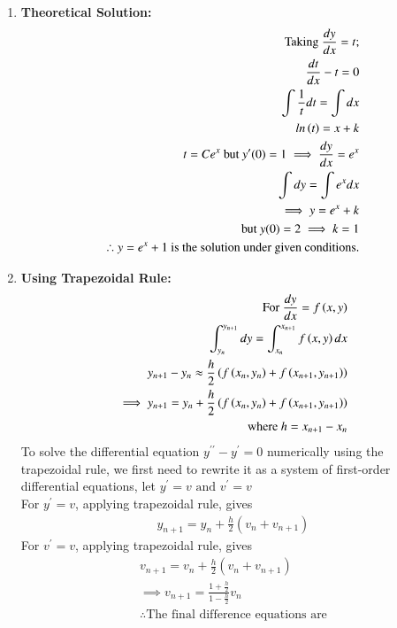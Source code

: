 \documentclass[journal]{IEEEtran}
\begin{document}
\begin{enumerate}
    \item \textbf{Theoretical Solution:}\\ 
    \begin{align}
        \text{Taking } \frac{dy}{dx}=t;\\
        \frac{dt}{dx}-t=0\\
        \int\frac{1}{t}dt=\int dx\\
        ln\left(t\right)=x+k\\
        t=Ce^x \text{ but } y^\prime(0)=1 \implies \frac{dy}{dx}=e^x\\
        \int dy=\int e^x dx\\
        \implies y = e^x+k\\
        \text{but } y(0)=2 \implies k=1\\
        \therefore y =e^x+1 \text{ is the solution under given conditions}.
    \end{align}
    \item \textbf{Using Trapezoidal Rule: }\\ 
    \begin{align}
        \text{For }\frac{dy}{dx}=f\left(x,y\right)\\
         \int_{y_n}^{y_{n+1}}dy=\int_{x_n}^{x_{n+1}}f\left(x,y\right)dx\\
         y_{n+1}-y_n\approx\frac{h}{2}\left(f\left(x_n,y_n\right)+f\left(x_{n+1},y_{n+1}\right)\right)\\
         \implies y_{n+1}=y_n+\frac{h}{2}\left(f\left(x_n,y_n\right)+f\left(x_{n+1},y_{n+1}\right)\right)\\
         \text{where } h=x_{n+1}-x_n
    \end{align}
    To solve the differential equation $y^{\prime \prime}-y^\prime=0$ numerically using the trapezoidal rule, we first need to rewrite it as a system of first-order differential equations, let $y^\prime=v \text{ and } v^\prime=v$\\
    For $y^\prime=v$, applying trapezoidal rule, gives
    \begin{align}
        y_{n+1} = y_{n} + \frac{h}{2} \left( v_{n} + v_{n+1} \right)
    \end{align}
    For $v^\prime=v$, applying trapezoidal rule, gives
    \begin{align}
        v_{n+1} = v_{n} + \frac{h}{2} \left( v_{n} + v_{n+1} \right)\\
        \implies v_{n+1}=\frac{1+\frac{h}{2}}{1-\frac{h}{2}}v_n\\
        \therefore \text{The final difference equations are}

\end{align}
\end{enumerate}
\end{document}
